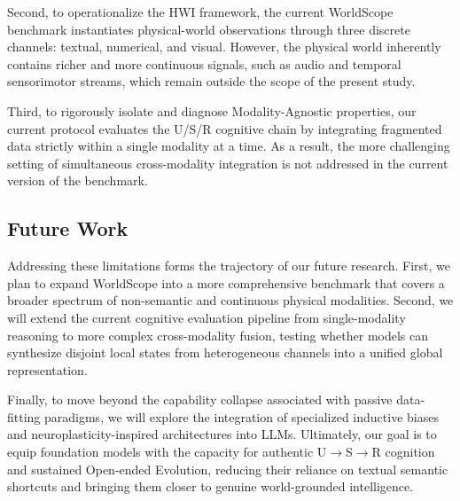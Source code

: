 Second, to operationalize the HWI framework, the current WorldScope benchmark instantiates physical-world observations through three discrete channels: textual, numerical, and visual. However, the physical world inherently contains richer and more continuous signals, such as audio and temporal sensorimotor streams, which remain outside the scope of the present study. 

Third, to rigorously isolate and diagnose Modality-Agnostic properties, our current protocol evaluates the U/S/R cognitive chain by integrating fragmented data strictly within a single modality at a time. As a result, the more challenging setting of simultaneous cross-modality integration is not addressed in the current version of the benchmark.

\subsection{Future Work}
\label{app:future_work}

Addressing these limitations forms the trajectory of our future research. First, we plan to expand WorldScope into a more comprehensive benchmark that covers a broader spectrum of non-semantic and continuous physical modalities. Second, we will extend the current cognitive evaluation pipeline from single-modality reasoning to more complex cross-modality fusion, testing whether models can synthesize disjoint local states from heterogeneous channels into a unified global representation. 

Finally, to move beyond the capability collapse associated with passive data-fitting paradigms, we will explore the integration of specialized inductive biases and neuroplasticity-inspired architectures into LLMs. Ultimately, our goal is to equip foundation models with the capacity for authentic U$\rightarrow$S$\rightarrow$R cognition and sustained Open-ended Evolution, reducing their reliance on textual semantic shortcuts and bringing them closer to genuine world-grounded intelligence.



